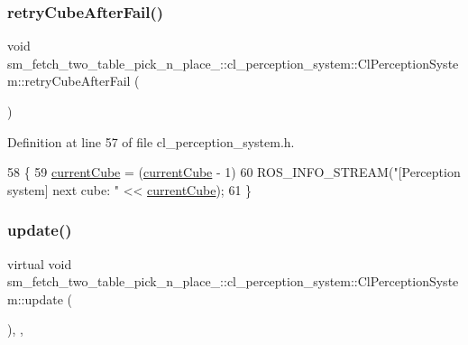 \subsubsection{\texorpdfstring{retry\+Cube\+After\+Fail()}{retryCubeAfterFail()}}
{\footnotesize\ttfamily void sm\+\_\+fetch\+\_\+two\+\_\+table\+\_\+pick\+\_\+n\+\_\+place\+\_\+::cl\+\_\+perception\+\_\+system\+::\+Cl\+Perception\+System\+::retry\+Cube\+After\+Fail (\begin{DoxyParamCaption}{ }\end{DoxyParamCaption})\hspace{0.3cm}{\ttfamily [inline]}}



Definition at line 57 of file cl\+\_\+perception\+\_\+system.\+h.


\begin{DoxyCode}
58     \{
59         \hyperlink{classsm__fetch__two__table__pick__n__place__1_1_1cl__perception__system_1_1ClPerceptionSystem_a0acc9100f7de93d128c356fe928f311a}{currentCube} = (\hyperlink{classsm__fetch__two__table__pick__n__place__1_1_1cl__perception__system_1_1ClPerceptionSystem_a0acc9100f7de93d128c356fe928f311a}{currentCube} - 1) %
60         ROS\_INFO\_STREAM(\textcolor{stringliteral}{"[Perception system] next cube: "} << \hyperlink{classsm__fetch__two__table__pick__n__place__1_1_1cl__perception__system_1_1ClPerceptionSystem_a0acc9100f7de93d128c356fe928f311a}{currentCube});
61     \}
\end{DoxyCode}
\mbox{\label{classsm__fetch__two__table__pick__n__place__1_1_1cl__perception__system_1_1ClPerceptionSystem_ac6e10d6fc38d2b1d561875298307c235}} 
\subsubsection{\texorpdfstring{update()}{update()}}
{\footnotesize\ttfamily virtual void sm\+\_\+fetch\+\_\+two\+\_\+table\+\_\+pick\+\_\+n\+\_\+place\+\_\+::cl\+\_\+perception\+\_\+system\+::\+Cl\+Perception\+System\+::update (\begin{DoxyParamCaption}{ }\end{DoxyParamCaption})\hspace{0.3cm}{\ttfamily [inline]}, {\ttfamily [override]}, {\ttfamily [virtual]}}



